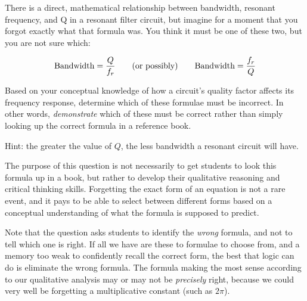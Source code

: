 

There is a direct, mathematical relationship between bandwidth, resonant frequency, and Q in a resonant filter circuit, but imagine for a moment that you forgot exactly what that formula was.  You think it must be one of these two, but you are not sure which:

$$\hbox{Bandwidth} = {Q \over f_r} \hskip 20pt \hbox{(or possibly)} \hskip 20pt \hbox{Bandwidth} = {f_r \over Q}$$

Based on your conceptual knowledge of how a circuit's quality factor affects its frequency response, determine which of these formulae must be incorrect.  In other words, {\it demonstrate} which of these must be correct rather than simply looking up the correct formula in a reference book.







Hint: the greater the value of $Q$, the less bandwidth a resonant circuit will have.







The purpose of this question is not necessarily to get students to look this formula up in a book, but rather to develop their qualitative reasoning and critical thinking skills.  Forgetting the exact form of an equation is not a rare event, and it pays to be able to select between different forms based on a conceptual understanding of what the formula is supposed to predict.

Note that the question asks students to identify the {\it wrong} formula, and not to tell which one is right.  If all we have are these to formulae to choose from, and a memory too weak to confidently recall the correct form, the best that logic can do is eliminate the wrong formula.  The formula making the most sense according to our qualitative analysis may or may not be {\it precisely} right, because we could very well be forgetting a multiplicative constant (such as $2 \pi$).




